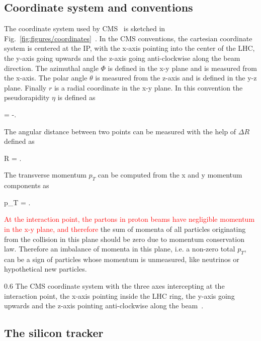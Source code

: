 \subsection{Coordinate system and conventions}


The coordinate system used by CMS~\cite{Chatrchyan:2008aa} is sketched in Fig.~\ref{fig:figures/coordinates}~\cite{Pantaleo:2293435}. In the CMS conventions, the cartesian coordinate system is centered at the IP, with the x-axis pointing into the center of the LHC, the y-axis going upwards and the z-axis going anti-clockwise along the beam direction. The azimuthal angle $\Phi$ is defined in the x-y plane and is measured from the x-axis. The polar angle $\theta$ is measured from the z-axis and is defined in the y-z plane. Finally $r$ is a radial coordinate in the x-y plane. In this convention the pseudorapidity $\eta$ is defined as

{
    \eta =  -\ln {}.
}

The angular distance between two points can be measured with the help of $\Delta R$ defined as

{
    \Delta R = .
}


The transverse momentum $p_{T}$ can be computed from the x and y momentum components as

{
    p_{T} =  .
}

\textcolor{red}{At the interaction point, the partons in proton beams have negligible momentum in the x-y plane, and therefore  } the sum of momenta of all particles originating from the collision in this plane should be zero due to momentum conservation law. Therefore an imbalance of momenta in this plane, i.e. a non-zero total $p_{T}$, can be a sign of particles whose momentum is unmeasured, like neutrinos or hypothetical new particles. 

                 {0.6}       %
                 { The CMS coordinate system with the three axes intercepting at the interaction point, the x-axis pointing inside the LHC ring, the y-axis going upwards and the z-axis pointing anti-clockwise along the beam~\cite{Pantaleo:2293435}. }

\subsection{The silicon tracker~\label{sec:tracker}}

